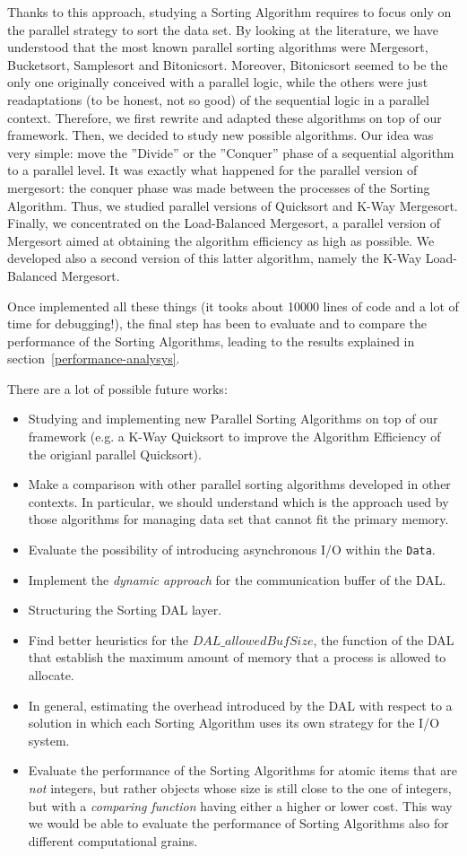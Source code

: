 Thanks to this approach, studying a Sorting Algorithm requires to focus only on the parallel strategy to sort the data set. By looking at the literature, we have understood that the most known parallel sorting algorithms were Mergesort, Bucketsort, Samplesort and Bitonicsort. Moreover, Bitonicsort seemed to be the only one originally conceived with a parallel logic, while the others were just readaptations (to be honest, not so good) of the sequential logic in a parallel context. Therefore, we first rewrite and adapted these algorithms on top of our framework. Then, we decided to study new possible algorithms. Our idea was very simple: move the ''Divide'' or the ''Conquer'' phase of a sequential algorithm to a parallel level. It was exactly what happened for the parallel version of mergesort: the conquer phase was made between the processes of the Sorting Algorithm. Thus, we studied parallel versions of Quicksort and K-Way Mergesort. Finally, we concentrated on the Load-Balanced Mergesort, a parallel version of Mergesort aimed at obtaining the algorithm efficiency as high as possible. We developed also a second version of this latter algorithm, namely the K-Way Load-Balanced Mergesort. 

Once implemented all these things (it tooks about 10000 lines of code and a lot of time for debugging!), the final step has been to evaluate and to compare the performance of the Sorting Algorithms, leading to the results explained in section~\ref{performance-analysys}. 

There are a lot of possible future works:  
\begin{itemize}
\item Studying and implementing new Parallel Sorting Algorithms on top of our framework (e.g. a K-Way Quicksort to improve the Algorithm Efficiency of the origianl parallel Quicksort).
\item Make a comparison with other parallel sorting algorithms developed in other contexts. In particular, we should understand which is the approach used by those algorithms for managing data set that cannot fit the primary memory.
\item Evaluate the possibility of introducing asynchronous I/O within the \texttt{Data}. 
\item Implement the \textit{dynamic approach} for the communication buffer of the DAL.
\item Structuring the Sorting DAL layer.
\item Find better heuristics for the $DAL\_allowedBufSize$, the function of the DAL that establish the maximum amount of memory that a process is allowed to allocate.
\item In general, estimating the overhead introduced by the DAL with respect to a solution in which each Sorting Algorithm uses its own strategy for the I/O system.
\item Evaluate the performance of the Sorting Algorithms for atomic items that are \textit{not} integers, but rather objects whose size is still close to the one of integers, but with a \textit{comparing function} having either a higher or lower cost. This way we would be able to evaluate the performance of Sorting Algorithms also for different computational grains.
\end{itemize}